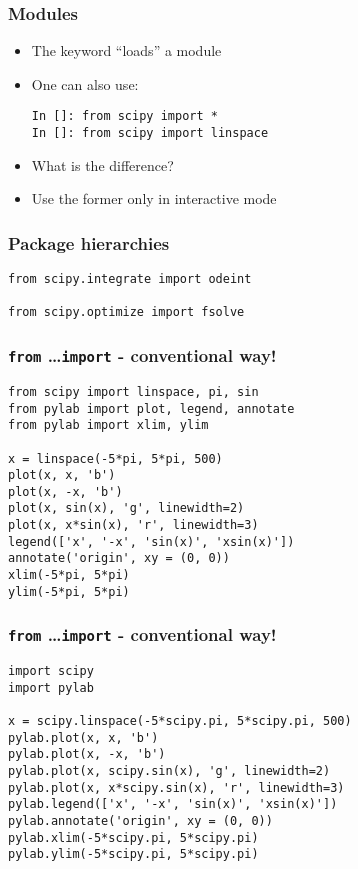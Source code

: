 \documentclass[14pt,compress]{beamer}
\newcommand{\kwrd}[1]{ \texttt{\textbf{\color{blue}{#1}}}  }
\begin{document}
\begin{frame}[fragile]
  \frametitle{Modules}
  \begin{itemize}
    \item The \kwrd{import} keyword ``loads'' a module
    \item One can also use:
      \begin{lstlisting}
In []: from scipy import *
In []: from scipy import linspace
      \end{lstlisting}    
    \item What is the difference?
    \item \alert{Use the former only in interactive mode}
    \end{itemize}
\end{frame}

\begin{frame}[fragile]
  \frametitle{Package hierarchies}
  \begin{lstlisting}
from scipy.integrate import odeint

from scipy.optimize import fsolve
  \end{lstlisting}
\end{frame}

\begin{frame}[fragile]
  \frametitle{\texttt{from} \ldots \texttt{import} - conventional way!}
  \small
  \begin{lstlisting}
from scipy import linspace, pi, sin
from pylab import plot, legend, annotate
from pylab import xlim, ylim

x = linspace(-5*pi, 5*pi, 500)
plot(x, x, 'b')
plot(x, -x, 'b')
plot(x, sin(x), 'g', linewidth=2)
plot(x, x*sin(x), 'r', linewidth=3)
legend(['x', '-x', 'sin(x)', 'xsin(x)'])
annotate('origin', xy = (0, 0))
xlim(-5*pi, 5*pi)
ylim(-5*pi, 5*pi)
  \end{lstlisting}
\end{frame}

\begin{frame}[fragile]
  \frametitle{\texttt{from} \ldots \texttt{import} - conventional way!}
  \small
  \begin{lstlisting}
import scipy
import pylab

x = scipy.linspace(-5*scipy.pi, 5*scipy.pi, 500)
pylab.plot(x, x, 'b')
pylab.plot(x, -x, 'b')
pylab.plot(x, scipy.sin(x), 'g', linewidth=2)
pylab.plot(x, x*scipy.sin(x), 'r', linewidth=3)
pylab.legend(['x', '-x', 'sin(x)', 'xsin(x)'])
pylab.annotate('origin', xy = (0, 0))
pylab.xlim(-5*scipy.pi, 5*scipy.pi)
pylab.ylim(-5*scipy.pi, 5*scipy.pi)
  \end{lstlisting}
\end{frame}
\end{document}
